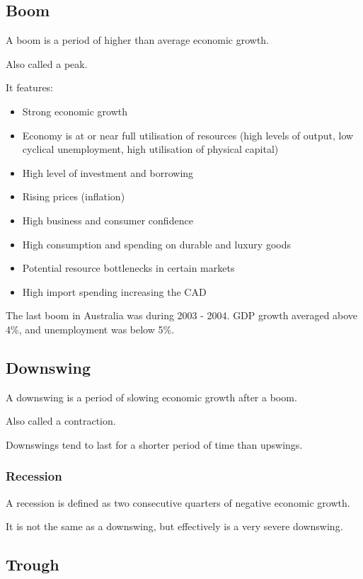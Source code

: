 \documentclass[a4paper,11pt]{article}
\begin{document}
\subsection{Boom}

A boom is a period of higher than average economic growth.

Also called a peak.

It features:

\begin{itemize}
\item Strong economic growth
\item Economy is at or near full utilisation of resources (high levels of
	output, low cyclical unemployment, high utilisation of physical capital)
\item High level of investment and borrowing
\item Rising prices (inflation)
\item High business and consumer confidence
\item High consumption and spending on durable and luxury goods
\item Potential resource bottlenecks in certain markets
\item High import spending increasing the CAD
\end{itemize}

The last boom in Australia was during 2003 - 2004. GDP growth averaged above
4\%, and unemployment was below 5\%.


\subsection{Downswing}

A downswing is a period of slowing economic growth after a boom.

Also called a contraction.

Downswings tend to last for a shorter period of time than upswings.


\subsubsection{Recession}

A recession is defined as two consecutive quarters of negative economic growth.

It is not the same as a downswing, but effectively is a very severe downswing.


\subsection{Trough}
\end{document}
